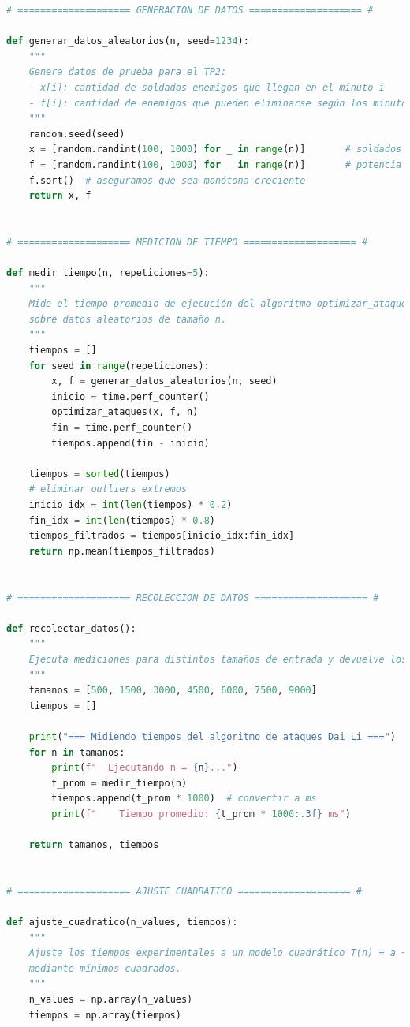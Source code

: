 \begin{lstlisting}[language=Python, caption=Código de ajuste por mínimos cuadrados para TP2]
# ==================== GENERACION DE DATOS ==================== #

def generar_datos_aleatorios(n, seed=1234):
    """
    Genera datos de prueba para el TP2:
    - x[i]: cantidad de soldados enemigos que llegan en el minuto i
    - f[i]: cantidad de enemigos que pueden eliminarse según los minutos de carga
    """
    random.seed(seed)
    x = [random.randint(100, 1000) for _ in range(n)]       # soldados por minuto
    f = [random.randint(100, 1000) for _ in range(n)]       # potencia acumulada
    f.sort()  # aseguramos que sea monótona creciente
    return x, f


# ==================== MEDICION DE TIEMPO ==================== #

def medir_tiempo(n, repeticiones=5):
    """
    Mide el tiempo promedio de ejecución del algoritmo optimizar_ataques
    sobre datos aleatorios de tamaño n.
    """
    tiempos = []
    for seed in range(repeticiones):
        x, f = generar_datos_aleatorios(n, seed)
        inicio = time.perf_counter()
        optimizar_ataques(x, f, n)
        fin = time.perf_counter()
        tiempos.append(fin - inicio)
    
    tiempos = sorted(tiempos)
    # eliminar outliers extremos
    inicio_idx = int(len(tiempos) * 0.2)
    fin_idx = int(len(tiempos) * 0.8)
    tiempos_filtrados = tiempos[inicio_idx:fin_idx]
    return np.mean(tiempos_filtrados)


# ==================== RECOLECCION DE DATOS ==================== #

def recolectar_datos():
    """
    Ejecuta mediciones para distintos tamaños de entrada y devuelve los resultados.
    """
    tamanos = [500, 1500, 3000, 4500, 6000, 7500, 9000]
    tiempos = []

    print("=== Midiendo tiempos del algoritmo de ataques Dai Li ===")
    for n in tamanos:
        print(f"  Ejecutando n = {n}...")
        t_prom = medir_tiempo(n)
        tiempos.append(t_prom * 1000)  # convertir a ms
        print(f"    Tiempo promedio: {t_prom * 1000:.3f} ms")

    return tamanos, tiempos


# ==================== AJUSTE CUADRATICO ==================== #

def ajuste_cuadratico(n_values, tiempos):
    """
    Ajusta los tiempos experimentales a un modelo cuadrático T(n) = a + b * n^2
    mediante mínimos cuadrados.
    """
    n_values = np.array(n_values)
    tiempos = np.array(tiempos)


\end{lstlisting}
